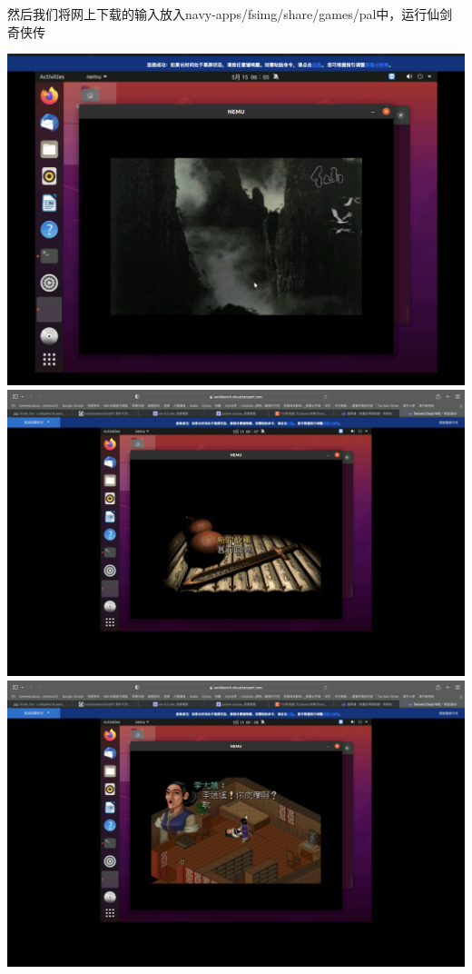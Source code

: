 \documentclass[UTF8,a4paper,10pt]{ctexart}
\begin{document}
然后我们将网上下载的输入放入navy-apps/fsimg/share/games/pal中，运行仙剑奇侠传
\begin{center}
  \includegraphics*[scale = 0.3]{pic/8}
  \includegraphics*[scale = 0.2]{pic/9}
  \includegraphics*[scale = 0.2]{pic/10}

\end{center}
\end{document}
